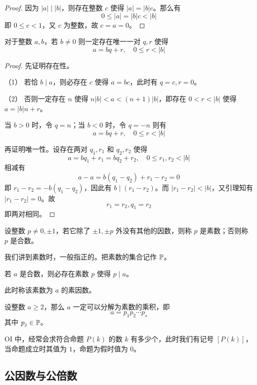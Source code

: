 \begin{proof}
	因为 $|a| \mid |b|$，则存在整数 $c$ 使得 $|a|=|b|c$。那么有
	$$0 \leqslant |a|=|b|c<|b|$$
	即 $0\leqslant c<1$，又 $c$ 为整数，故 $c=a=0$。
\end{proof}

\begin{theorem}
	对于整数 $a,b$，若 $b\ne 0$ 则一定存在唯一一对 $q,r$ 使得
	$$a=bq+r,\quad 0 \leqslant r< |b|$$
\end{theorem}

\begin{proof}
	先证明存在性。
	
	（1） 若恰 $b \mid a$，则必存在 $c$ 使得 $a=bc$，此时有 $q=c,r=0$。

	（2） 否则一定存在 $n$ 使得 $n|b|<a<(n+1)|b|$，即存在 $0<r<|b|$ 使得 $a=|b|n+r$。
	
	当 $b>0$ 时，令 $q=n$；当 $b<0$ 时，令 $q=-n$ 则有
	$$a=bq+r,\quad 0 \leqslant r< |b|$$

	再证明唯一性。设存在两对 $q_1,r_1$ 和 $q_2,r_2$ 使得
	$$a=bq_1+r_1=bq_2+r_2,\quad 0 \leqslant r_1,r_2< |b|$$
	相减有
	$$a-a=b(q_1-q_2)+r_1-r_2=0$$
	即 $r_1-r_2=-b(q_1-q_2)$，因此有 $b \mid (r_1-r_2)$。而 $|r_1-r_2|<|b|$，又引理知有 $|r_1-r_2|=0$。故
	$$r_1=r_2,q_1=r_2$$
	即两对相同。
\end{proof}

\begin{definition}[素数]
    设整数 $p \ne 0,\pm 1$，若它除了 $\pm 1, \pm p$ 外没有其他的因数，则称 $p$ 是素数；否则称 $p$ 是合数。
\end{definition}

我们讲到素数时，一般指正的。把素数的集合记作 $\mathbb{P}$。

\begin{theorem}
    若 $a$ 是合数，则必存在素数 $p$ 使得 $p \mid a$。
\end{theorem}

此时称该素数为 $a$ 的素因数。

\begin{theorem}
    设整数 $a \geqslant 2$，那么 $a$ 一定可以分解为素数的乘积，即
    \[ a = p_1p_2\cdots p_s \]
    其中 $p_j \in \mathbb{P}$。
\end{theorem}

OI 中，经常会求符合命题 $P(k)$ 的数 $k$ 有多少个，此时我们有记号 $[P(k)]$，当命题成立时其值为 $1$，命题为假时值为 $0$。

\subsection{公因数与公倍数}

